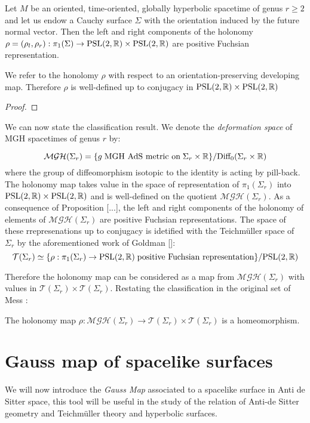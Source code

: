 \begin{proposition}
    Let $M$ be an oriented, time-oriented, globally hyperbolic spacetime of genus $r\geq 2$ and let us endow a Cauchy surface $\Sigma$ with the orientation induced by the future normal vector. Then the left and right components of the holonomy $\rho=(\rho_l,\rho_r):\pi_1(\Sigma)\to\text{PSL}(2,\mathbb{R})\times\text{PSL}(2,\mathbb{R})$ are positive Fuchsian representation. 
\end{proposition}

\begin{observation}
We refer to the honolomy $\rho$ with respect to an orientation-preserving developing map. Therefore $\rho$ is well-defined up to conjugacy in $\text{PSL}(2,\mathbb{R})\times\text{PSL}(2,\mathbb{R})$
\end{observation}
\begin{proof}
    
\end{proof}

We can now state the classification result. We denote the \textit{deformation space} of MGH spacetimes of genus $r$ by:

\[
    \mathcal{MGH}(\Sigma_r)=\{g\;\text{MGH AdS metric on}\;\Sigma_r\times\mathbb{R}\}/\text{Diff}_0(\Sigma_r\times\mathbb{R})
\]
where the group of diffeomorphism isotopic to the identity is acting by pill-back. The holonomy map takes value in the space of representation of $\pi_1(\Sigma_r)$ into $\text{PSL}(2,\mathbb{R})\times\text{PSL}(2,\mathbb{R})$ and is well-defined on the quotient $ \mathcal{MGH}(\Sigma_r).$
As a consequence of Proposition [...], the left and right components of the holonomy of elements of $ \mathcal{MGH}(\Sigma_r)$ are positive Fuchsian representations. The space of these rrepresenations up to conjugacy is idetified with the Teichm\"uller space of $\Sigma_r$ by the aforementioned work of Goldman []:
\[
    \mathcal{T}(\Sigma_r)\simeq\{\rho:\pi_1(\Sigma_r)\to\text{PSL}(2,\mathbb{R})\;\text{positive Fuchsian representation}\}/\text{PSL}(2,\mathbb{R})
\]

Therefore the holonomy map can be considered as a map from $ \mathcal{MGH}(\Sigma_r)$ with values in $\mathcal{T}(\Sigma_r)\times\mathcal{T}(\Sigma_r).$ Restating the classification in the original set of Mess \cite{Mess}: 
\begin{theorem}
    The holonomy map $\rho:\mathcal{MGH}(\Sigma_r)\to\mathcal{T}(\Sigma_r)\times\mathcal{T}(\Sigma_r)$ is a homeomorphism.
\end{theorem}
\section{Gauss map of spacelike surfaces}
    We will now introduce the \textit{Gauss Map} associated to a spacelike surface in Anti de Sitter space, this tool will be  useful in the study of the relation of Anti-de Sitter geometry and Teichm\"uller theory and hyperbolic surfaces.

